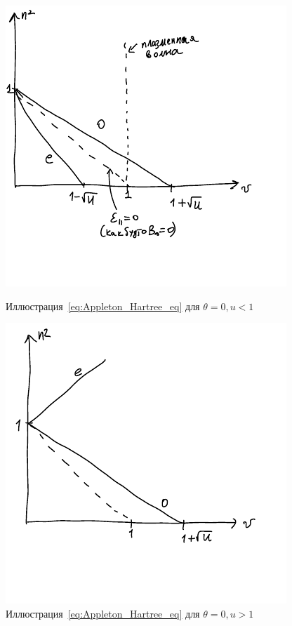 \documentclass[10pt, a4paper]{article}
\begin{document}
\begin{itemize}
	\begin{figure}[ht]
		\begin{center}
			\begin{minipage}[h]{0.35\linewidth}
				\includegraphics[width=1\linewidth]{theta0-u-less-1.pdf}
				\caption{Иллюстрация~\eqref{eq:Appleton_Hartree_eq} для $\theta=0, u<1$} 
				\label{fig:disp_eq_th_0_u_less_1}
			\end{minipage}
			\hfill
			\begin{minipage}[h]{0.35\linewidth}
				\includegraphics[width=1\linewidth]{theta0-u-more-1.pdf}
				\caption{Иллюстрация~\eqref{eq:Appleton_Hartree_eq} для $\theta=0, u>1$}
				\label{fig:disp_eq_th_0_u_more_1}
			\end{minipage}
		\end{center}
	\end{figure}
	

\end{itemize}
\end{document}
